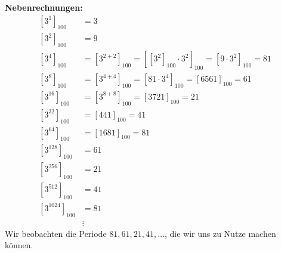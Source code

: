 \documentclass{../crypto}
\begin{document}
\textbf{Nebenrechnungen:}
\begin{align*}
  \left[3^{1}\right]_{100}                                                            & = 3                            \\
  \left[3^{2}\right]_{100}                                                            & = 9                            \\
  \left[3^{4}\right]_{100}                                                            & = \left[3^{2+2}\right]_{100}
                            = \left[\left[3^{2}\right]_{100} \cdot 3^{2}\right]_{100}
                            = \left[9 \cdot 3^{2}\right]_{100} = 81                                                    \\
  \left[3^{8}\right]_{100}                                                            & = \left[3^{4+4}\right]_{100}
                            = \left[81 \cdot 3^{4}\right]_{100}
                            = \left[6561\right]_{100} = 61                                                             \\
  \left[3^{16}\right]_{100}                                                           & = \left[3^{8+8}\right]_{100}
                             = \left[3721\right]_{100} = 21                                                            \\
  \left[3^{32}\right]_{100}                                                           & = \left[441\right]_{100} = 41  \\
  \left[3^{64}\right]_{100}                                                           & = \left[1681\right]_{100} = 81 \\
  \left[3^{128}\right]_{100}                                                          & = 61                           \\
  \left[3^{256}\right]_{100}                                                          & = 21                           \\
  \left[3^{512}\right]_{100}                                                          & = 41                           \\
  \left[3^{1024}\right]_{100}                                                         & = 81                           \\
                                                                                      & \vdots
\end{align*}
Wir beobachten die Periode $81, 61, 21, 41, \dots$, die wir uns zu Nutze machen können.
\end{document}
